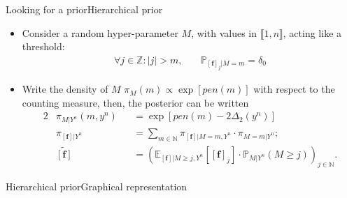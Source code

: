 \documentclass[10pt]{beamer}
\begin{document}
\begin{frame}{Looking for a prior}{Hierarchical prior}
\begin{itemize}
\item Consider a \textcolor{red!90!black}{random hyper-parameter} \textcolor{red!90!black}{$M$}, with values in $\llbracket 1, n \rrbracket$, acting like a threshold:
\begin{align*}
\forall j \in \mathbb{Z} : \vert j \vert > m ,& \quad \mathbb{P}_{\left[\boldsymbol{f}\right]_{j}\vert M = m} = \delta_{0}
\end{align*}
\item Write the density of $M$ \textcolor{red!90!black}{$\pi_{M}(m) \propto \exp\left[pen(m)\right]$} with respect to the counting measure, then, the posterior can be written
\textcolor{red!90!black}{
\begin{alignat*}{2}
&\pi_{M \vert Y^{n}}(m, y^{n}) && = \exp\left[pen(m) - 2 \Delta_{2}(y^{n})\right]\\
&\pi_{\left[\boldsymbol{f}\right]\vert Y^{n}} &&= \sum\limits_{m \in \mathbb{N}} \pi_{\left[\boldsymbol{f}\right] \vert M = m, Y^{n}} \cdot \pi_{M = m \vert Y^{n}};\\
&\widetilde{\left[\boldsymbol{f}\right]} &&= \left(\mathbb{E}_{\left[\boldsymbol{f}\right] \vert M \geq j, Y^{n}}\left[\left[\boldsymbol{f}\right]_{j}\right] \cdot \mathbb{P}_{M \vert Y^{n}}\left(M \geq j\right)\right)_{j \in \mathbb{N}}.
\end{alignat*}}
\end{itemize}

\end{frame}


\begin{frame}{Hierarchical prior}{Graphical representation}
\begin{center}
\end{center}
\end{frame}
\end{document}
